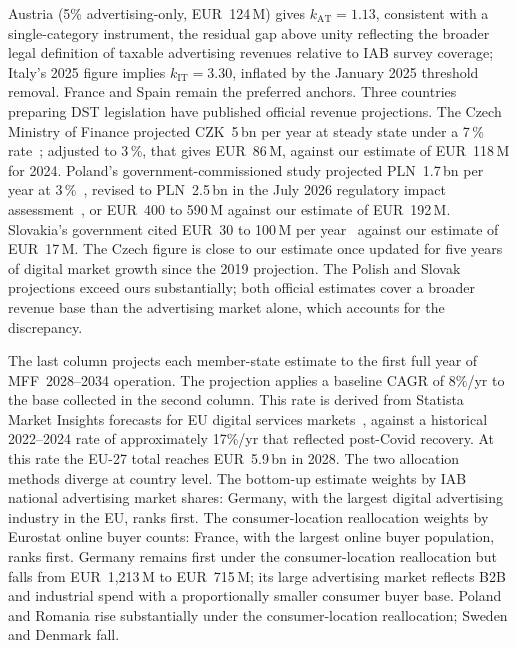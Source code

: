 \documentclass[../../main]{subfiles}
\begin{document}
Austria (5\% advertising-only, EUR~124\,M) gives $k_{\mathrm{AT}} = 1.13$, consistent with a single-category instrument, the residual gap above unity reflecting the broader legal definition of taxable advertising revenues relative to IAB survey coverage; Italy's 2025 figure implies $k_{\mathrm{IT}} = 3.30$, inflated by the January 2025 threshold removal.
France and Spain remain the preferred anchors.
Three countries preparing DST legislation have published official revenue projections. The Czech Ministry of Finance projected CZK~5\,bn per year at steady state under a 7\,\% rate~\citep{mf_cz_dst_2019}; adjusted to 3\,\%, that gives EUR~86\,M, against our estimate of EUR~118\,M for 2024. Poland's government-commissioned study projected PLN~1.7\,bn per year at 3\,\%~\citep{instrat_poland_dst_2025}, revised to PLN~2.5\,bn in the July 2026 regulatory impact assessment~\citep{poland_ud385_2026}, or EUR~400 to 590\,M against our estimate of EUR~192\,M. Slovakia's government cited EUR~30 to 100\,M per year~\citep{mirri_slovakia_dst_2025} against our estimate of EUR~17\,M. The Czech figure is close to our estimate once updated for five years of digital market growth since the 2019 projection. The Polish and Slovak projections exceed ours substantially; both official estimates cover a broader revenue base than the advertising market alone, which accounts for the discrepancy.


The last column projects each member-state estimate to the first full year of MFF~2028--2034 operation.
The projection applies a baseline CAGR of 8\%/yr to the base collected in the second column.
This rate is derived from Statista Market Insights forecasts for EU digital services markets~\citep{statista_digital_market_insights_2025}, against a historical 2022--2024 rate of approximately 17\%/yr that reflected post-Covid recovery.
At this rate the EU-27 total reaches EUR~5.9\,bn in 2028. %
The two allocation methods diverge at country level.
The bottom-up estimate weights by IAB national advertising market shares: Germany, with the largest digital advertising industry in the EU, ranks first.
The consumer-location reallocation weights by Eurostat online buyer counts: France, with the largest online buyer population, ranks first.
Germany remains first under the consumer-location reallocation but falls from EUR~1{,}213\,M to EUR~715\,M; its large advertising market reflects B2B and industrial spend with a proportionally smaller consumer buyer base.
Poland and Romania rise substantially under the consumer-location reallocation; Sweden and Denmark fall.
\end{document}
